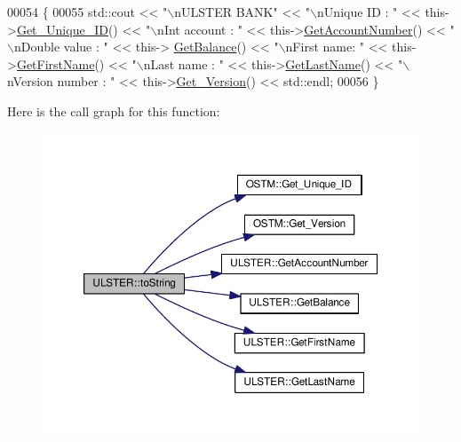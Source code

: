 \begin{DoxyCode}
00054 \{
00055    std::cout << \textcolor{stringliteral}{"\(\backslash\)nULSTER BANK"} << \textcolor{stringliteral}{"\(\backslash\)nUnique ID : "} << this->\hyperlink{class_o_s_t_m_a5a01a8b98d16b1d1904ecf9356e7b71d_a5a01a8b98d16b1d1904ecf9356e7b71d}{Get\_Unique\_ID}() << \textcolor{stringliteral}{"\(\backslash\)nInt account
       : "} << this->\hyperlink{class_u_l_s_t_e_r_a1ad672ae865a9f559bf4d3c33c243d63_a1ad672ae865a9f559bf4d3c33c243d63}{GetAccountNumber}() << \textcolor{stringliteral}{"\(\backslash\)nDouble value : "} << this->
      \hyperlink{class_u_l_s_t_e_r_ae70da9686ac038862900182a984e56eb_ae70da9686ac038862900182a984e56eb}{GetBalance}() << \textcolor{stringliteral}{"\(\backslash\)nFirst name: "} << this->\hyperlink{class_u_l_s_t_e_r_a85ee4e42d9b309608d8dfbedac65ff27_a85ee4e42d9b309608d8dfbedac65ff27}{GetFirstName}() << \textcolor{stringliteral}{"\(\backslash\)nLast name : "} << 
      this->\hyperlink{class_u_l_s_t_e_r_a9320b012bccda4ebf6b41c9ed972743c_a9320b012bccda4ebf6b41c9ed972743c}{GetLastName}()  << \textcolor{stringliteral}{"\(\backslash\)nVersion number : "} << this->\hyperlink{class_o_s_t_m_a1f1db9d482f22c8e7caa17dfb340626b_a1f1db9d482f22c8e7caa17dfb340626b}{Get\_Version}() << std::endl;
00056 \}
\end{DoxyCode}


Here is the call graph for this function\+:
\nopagebreak
\begin{figure}[H]
\begin{center}
\leavevmode
\includegraphics[width=350pt]{class_u_l_s_t_e_r_a341bbcb3f7d6ef10f30d4734ceed10ee_a341bbcb3f7d6ef10f30d4734ceed10ee_cgraph}
\end{center}
\end{figure}




